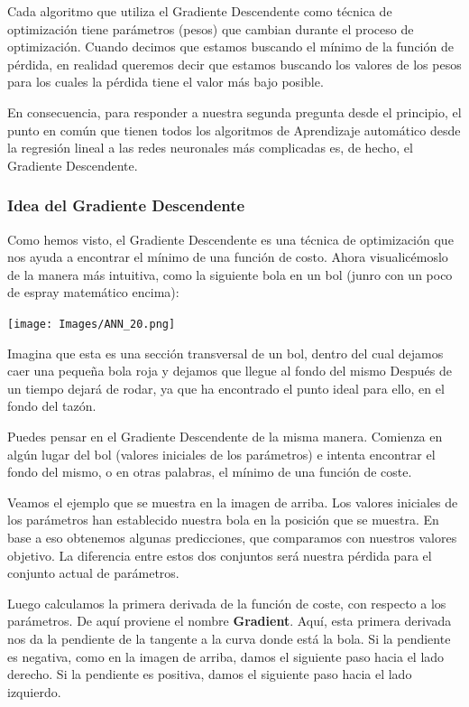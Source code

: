 \documentclass[
]{book}
\begin{document}
Cada algoritmo que utiliza el Gradiente Descendente como técnica de optimización tiene parámetros (pesos) que cambian durante el proceso de optimización. Cuando decimos que estamos buscando el mínimo de la función de pérdida, en realidad queremos decir que estamos buscando los valores de los pesos para los cuales la pérdida tiene el valor más bajo posible.

En consecuencia, para responder a nuestra segunda pregunta desde el principio, el punto en común que tienen todos los algoritmos de Aprendizaje automático desde la regresión lineal a las redes neuronales más complicadas es, de hecho, el Gradiente Descendente.

\hypertarget{idea-del-gradiente-descendente}{%
\subsubsection{Idea del Gradiente Descendente}\label{idea-del-gradiente-descendente}}

Como hemos visto, el Gradiente Descendente es una técnica de optimización que nos ayuda a encontrar el mínimo de una función de costo. Ahora visualicémoslo de la manera más intuitiva, como la siguiente bola en un bol (junro con un poco de espray matemático encima):

\texttt{[image: Images/ANN\_20.png]}

Imagina que esta es una sección transversal de un bol, dentro del cual dejamos caer una pequeña bola roja y dejamos que llegue al fondo del mismo Después de un tiempo dejará de rodar, ya que ha encontrado el punto ideal para ello, en el fondo del tazón.

Puedes pensar en el Gradiente Descendente de la misma manera. Comienza en algún lugar del bol (valores iniciales de los parámetros) e intenta encontrar el fondo del mismo, o en otras palabras, el mínimo de una función de coste.

Veamos el ejemplo que se muestra en la imagen de arriba. Los valores iniciales de los parámetros han establecido nuestra bola en la posición que se muestra. En base a eso obtenemos algunas predicciones, que comparamos con nuestros valores objetivo. La diferencia entre estos dos conjuntos será nuestra pérdida para el conjunto actual de parámetros.

Luego calculamos la primera derivada de la función de coste, con respecto a los parámetros. De aquí proviene el nombre \textbf{Gradient}. Aquí, esta primera derivada nos da la pendiente de la tangente a la curva donde está la bola. Si la pendiente es negativa, como en la imagen de arriba, damos el siguiente paso hacia el lado derecho. Si la pendiente es positiva, damos el siguiente paso hacia el lado izquierdo.
\end{document}
